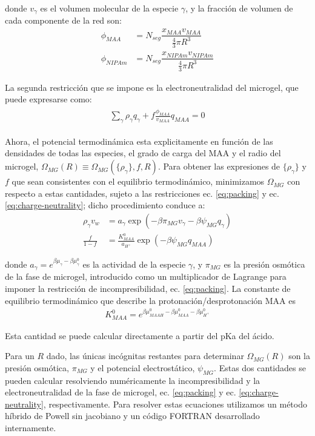 \noindent donde $v_\gamma$  es el volumen molecular de la especie $\gamma$, y la fracci\'on de volumen de cada componente de la red son: 
%
%
\begin{align}
\phi_{MAA}&=N_{seg}\dfrac{x_{MAA}v_{MAA}}{\frac{4}{3}\pi R^3}\\
\phi_{NIPAm}&=N_{seg}\dfrac{x_{NIPAm}v_{NIPAm}}{\frac{4}{3}\pi R^3}
\end{align}


La segunda restricci\'on  que se impone es la electroneutralidad del microgel, que puede expresarse como:
%
%
\begin{align}
\begin{aligned}
\sum_{\gamma  } \rho_\gamma q_\gamma + f\frac{\phi_{MAA}}{v_{MAA}}q_{MAA}=0
\end{aligned}
\label{eq:charge-neutrality}
\end{align}


Ahora, el potencial termodin\'amica esta explicitamente en funci\'on de las densidades de todas las especies, el grado de carga del MAA y el radio del microgel, $\Omega_{MG}(R)\equiv\Omega_{MG}(\{\rho_\gamma\},f,R)$.
Para obtener las expresiones de $\{\rho_\gamma\}$ y $f$ que sean consistentes con el equilibrio termodin\'amico, minimizamos $\Omega_{MG}$ con respecto a estas cantidades, sujeto a las restricciones ec. \ref{eq:packing} y ec. \ref{eq:charge-neutrality}; dicho procedimiento conduce a: 
%
%
\begin{align}
\rho_\gamma v_w &= a_\gamma \exp(-\beta\pi_{MG}v_\gamma -\beta\psi_{MG}q_{\gamma})\\
\frac{f}{1-f}&= \frac{K^0_{MAA}}{a_{H^+}}\exp(-\beta\psi_{MG}q_{MAA})\label{eq:fcharge}
\end{align}

\noindent donde $a_\gamma = e^{\beta\mu_\gamma-\beta\mu_\gamma^0}$ es la actividad de la especie $\gamma$, y $\pi_{MG}$ es la presi\'on osm\'otica de la fase de microgel, introducido como un multiplicador de Lagrange para imponer la restricci\'on de incompresibilidad, ec. \ref{eq:packing}.
La constante de equilibrio termodin\'amico que describe la protonaci\'on/desprotonaci\'on MAA es
%
%
\begin{align}
K^0_{MAA}= e^{\beta\mu^0_{MAAH}-\beta\mu^0_{MAA}-\beta\mu^0_{H^+}}
\end{align}

\noindent Esta cantidad se puede calcular directamente a partir del pKa del \'acido.


Para un $R$ dado, las \'unicas inc\'ognitas restantes para determinar $\Omega_{MG}(R)$ son la presi\'on osm\'otica, $\pi_{MG}$ y el potencial electrost\'atico, $\psi_{MG}$.
Estas dos cantidades se pueden calcular resolviendo num\'ericamente la incompresibilidad y la electroneutralidad de la fase de microgel, ec. \ref{eq:packing} y ec. \ref{eq:charge-neutrality}, respectivamente.
Para resolver estas ecuaciones utilizamos un m\'etodo h\'ibrido de Powell sin jacobiano y un c\'odigo FORTRAN desarrollado internamente.


